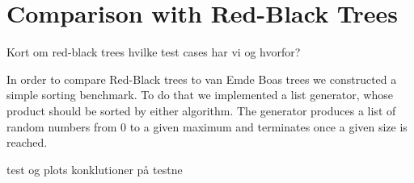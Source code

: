 \section*{Comparison with Red-Black Trees}
Kort om red-black trees
hvilke test cases har vi og hvorfor?

In order to compare Red-Black trees to van Emde Boas trees we constructed a simple sorting benchmark.
To do that we implemented a list generator, whose product should be sorted by either algorithm.
The generator produces a list of random numbers from 0 to a given maximum and terminates once a given size is reached.

test og plots
konklutioner på testne